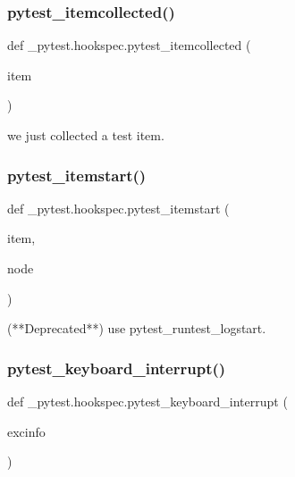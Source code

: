 \subsubsection{\texorpdfstring{pytest\+\_\+itemcollected()}{pytest\_itemcollected()}}
{\footnotesize\ttfamily def \+\_\+pytest.\+hookspec.\+pytest\+\_\+itemcollected (\begin{DoxyParamCaption}\item[{}]{item }\end{DoxyParamCaption})}

\begin{DoxyVerb}we just collected a test item. \end{DoxyVerb}
 \mbox{\label{namespace__pytest_1_1hookspec_aca8f78dbd68f190094841a8e8ca6e276}} 
\subsubsection{\texorpdfstring{pytest\+\_\+itemstart()}{pytest\_itemstart()}}
{\footnotesize\ttfamily def \+\_\+pytest.\+hookspec.\+pytest\+\_\+itemstart (\begin{DoxyParamCaption}\item[{}]{item,  }\item[{}]{node }\end{DoxyParamCaption})}

\begin{DoxyVerb}(**Deprecated**) use pytest_runtest_logstart. \end{DoxyVerb}
 \mbox{\label{namespace__pytest_1_1hookspec_aed9a7463988eeeeb6c439fabf4cb3267}} 
\subsubsection{\texorpdfstring{pytest\+\_\+keyboard\+\_\+interrupt()}{pytest\_keyboard\_interrupt()}}
{\footnotesize\ttfamily def \+\_\+pytest.\+hookspec.\+pytest\+\_\+keyboard\+\_\+interrupt (\begin{DoxyParamCaption}\item[{}]{excinfo }\end{DoxyParamCaption})}

